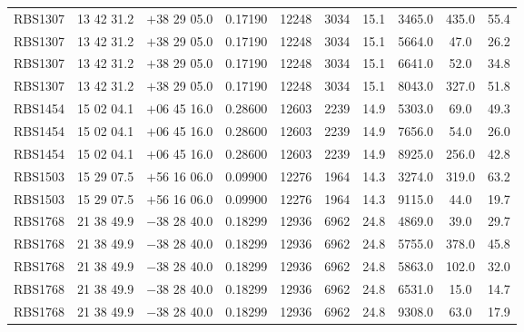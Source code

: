 \begin{landscape}
\begin{center}
\begin{longtable}{l c c c c c c c c c}
RBS1307  &                 13 42 31.2  &         $+$38 29 05.0  &       0.17190  & 12248  &   3034  &       15.1  &      3465.0  &  435.0  &  55.4  \\
RBS1307  &                 13 42 31.2  &         $+$38 29 05.0  &       0.17190  & 12248  &   3034  &       15.1  &      5664.0  &  47.0  &   26.2  \\
RBS1307  &                 13 42 31.2  &         $+$38 29 05.0  &       0.17190  & 12248  &   3034  &       15.1  &      6641.0  &  52.0  &   34.8  \\
RBS1307  &                 13 42 31.2  &         $+$38 29 05.0  &       0.17190  & 12248  &   3034  &       15.1  &      8043.0  &  327.0  &  51.8  \\
RBS1454  &                 15 02 04.1  &         $+$06 45 16.0  &       0.28600  & 12603  &   2239  &       14.9  &      5303.0  &  69.0  &   49.3  \\
RBS1454  &                 15 02 04.1  &         $+$06 45 16.0  &       0.28600  & 12603  &   2239  &       14.9  &      7656.0  &  54.0  &   26.0  \\
RBS1454  &                 15 02 04.1  &         $+$06 45 16.0  &       0.28600  & 12603  &   2239  &       14.9  &      8925.0  &  256.0  &  42.8  \\
RBS1503  &                 15 29 07.5  &         $+$56 16 06.0  &       0.09900  & 12276  &   1964  &       14.3  &      3274.0  &  319.0  &  63.2  \\
RBS1503  &                 15 29 07.5  &         $+$56 16 06.0  &       0.09900  & 12276  &   1964  &       14.3  &      9115.0  &  44.0  &   19.7  \\
RBS1768  &                 21 38 49.9  &         $-$38 28 40.0  &       0.18299  & 12936  &   6962  &       24.8  &      4869.0  &  39.0  &   29.7  \\
RBS1768  &                 21 38 49.9  &         $-$38 28 40.0  &       0.18299  & 12936  &   6962  &       24.8  &      5755.0  &  378.0  &  45.8  \\
RBS1768  &                 21 38 49.9  &         $-$38 28 40.0  &       0.18299  & 12936  &   6962  &       24.8  &      5863.0  &  102.0  &  32.0  \\
RBS1768  &                 21 38 49.9  &         $-$38 28 40.0  &       0.18299  & 12936  &   6962  &       24.8  &      6531.0  &  15.0  &   14.7  \\
RBS1768  &                 21 38 49.9  &         $-$38 28 40.0  &       0.18299  & 12936  &   6962  &       24.8  &      9308.0  &  63.0  &   17.9  \\

\end{longtable}
\end{center}
\end{landscape}

